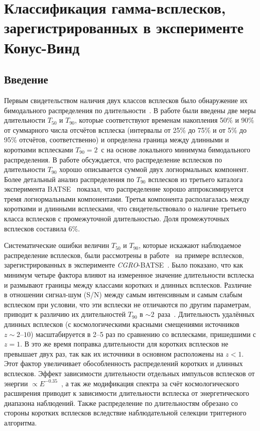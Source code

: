 \chapter{Классификация гамма-всплесков, зарегистрированных в эксперименте Конус-Винд}\label{KW_GRB_classification}

\section{Введение}
Первым свидетельством наличия двух классов всплесков было обнаружение их бимодального 
распределения по длительности~\citep{Mazets_1981_part_1,Norris_1984,Kouveliotou_1993,Aptekar_1998}. 
В работе \citep{Kouveliotou_1993} были введены две меры длительности $T_{50}$ и $T_{90}$, 
которые соответствуют временам накопления 50\% и 90\% от суммарного числа отсчётов 
всплеска (интервалы от 25\% до 75\% и от 5\% до 95\% отсчётов, соответственно) 
и определена граница между длинными и короткими всплесками $T_{90}=2$~с 
на основе локального минимума бимодального распределения. 
В работе \citep{McBreen_1994} обсуждается, что распределение всплесков по 
длительности $T_{90}$ хорошо описывается суммой двух логнормальных компонент. 
Более детальный анализ распределения по $T_{90}$ всплесков из третьего каталога 
эксперимента BATSE~\citep{Horvath_2002} показал, что распределение 
хорошо аппроксимируется тремя логнормальными компонентами. 
Третья компонента располагалась между короткими и длинными всплесками, 
что свидетельствовало о наличие третьего класса всплесков с промежуточной длительностью.
Доля промежуточных всплесков составила 6\%. 

Систематические ошибки величин $T_{50}$ и $T_{90}$, которые искажают наблюдаемое 
распределение всплесков, были рассмотрены в работе~\citep{Norris_and_Bonnel_2006ApJ} 
на примере всплесков, зарегистрированных в эксперименте \textit{CGRO}-BATSE~\citep{Fishman_1992NASCP3137}. 
Было показано, что как минимум четыре фактора влияют на измеренное значение длительности 
всплеска и размывают границы между классами коротких и длинных всплесков. 
Различие в отношении сигнал-шум (S/N) между самым интенсивным и самым слабым 
всплеском  при условии, что эти всплески не отличаются по другим параметрам, 
приводит к различию их длительностей $T_{90}$ в $\sim 2$~раза~\citep{Bonnell_1997}. 
Длительность удалённых длинных всплесков (с космологическими красными смещениями источников 
$z \sim 2 \textrm{--}10$) масштабируется в 2--5 раз по сравнению со всплесками, 
пришедшими с $z=1$. В это же время поправка длительности 
для коротких всплесков не превышает двух раз, так как их источники в основном 
расположены на $z<1$. Этот фактор увеличивает обособленность распределений 
коротких и длинных всплесков. Эффект зависимости длительности отдельных импульсов 
всплесков от энергии $\propto E^{-0.35}$~\citep{Fenimore_1995}, а так же  модификация 
спектра за счёт космологического расширения приводит к зависимости длительности 
всплеска от энергетического диапазона наблюдений. Также распределение по длительностям 
обрезано со стороны коротких всплесков вследствие наблюдательной селекции триггерного 
алгоритма. 


